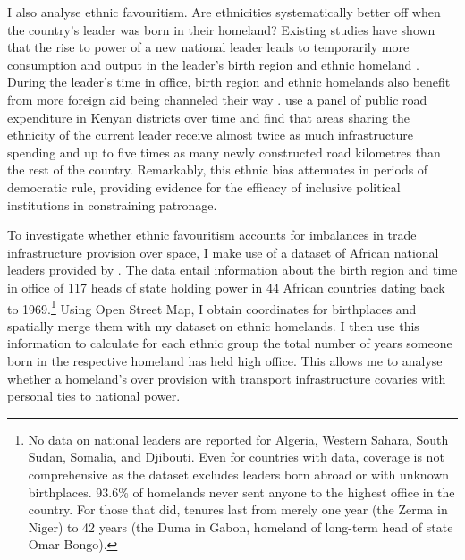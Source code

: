 \documentclass[11pt, oneside]{article}   	%
\begin{document}
I also analyse ethnic favouritism. Are ethnicities systematically better off when the country's leader was born in their homeland? Existing studies have shown that the rise to power of a new national leader leads to temporarily more consumption and output in the leader's birth region \citep{Hodler_RegionalFavoritism_2014} and ethnic homeland \citep{DeLuca_Ethnicfavoritismaxiom_2018}. During the leader's time in office, birth region and ethnic homelands also benefit from more foreign aid being channeled their way \citep{Dreher_AiddemandAfrican_2016}. \cite{Burgess_ValueDemocracyEvidence_2015} use a panel of public road expenditure in Kenyan districts over time and find that areas sharing the ethnicity of the current leader receive almost twice as much infrastructure spending and up to five times as many newly constructed road kilometres than the rest of the country. Remarkably, this ethnic bias attenuates in periods of democratic rule, providing evidence for the efficacy of inclusive political institutions in constraining patronage.

To investigate whether ethnic favouritism accounts for imbalances in trade infrastructure provision over space, I make use of a dataset of African national leaders provided by \cite{Dreher_AiddemandAfrican_2016}. The data entail information about the birth region and time in office of 117 heads of state holding power in 44 African countries dating back to 1969.\footnote{No data on national leaders are reported for Algeria, Western Sahara, South Sudan, Somalia, and Djibouti. Even for countries with data, coverage is not comprehensive as the dataset excludes leaders born abroad or with unknown birthplaces. 93.6\% of homelands never sent anyone to the highest office in the country. For those that did, tenures last from merely one year (the Zerma in Niger) to 42 years (the Duma in Gabon, homeland of long-term head of state Omar Bongo).} Using Open Street Map, I obtain coordinates for birthplaces and spatially merge them with my dataset on ethnic homelands. I then use this information to calculate for each ethnic group the total number of years someone born in the respective homeland has held high office. This allows me to analyse whether a homeland's over provision with transport infrastructure covaries with personal ties to national power.
\end{document}
